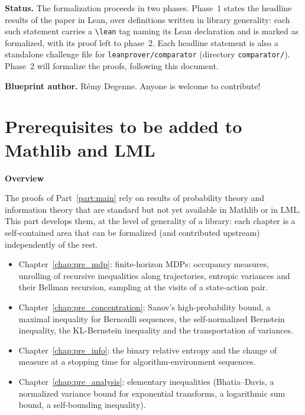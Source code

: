 \textbf{Status.} The formalization proceeds in two phases. Phase~1 states the headline results
of the paper in Lean, over definitions written in library generality: each such statement
carries a \verb+\lean+ tag naming its Lean declaration and is marked as formalized, with its
proof left to phase~2. Each headline statement is also a standalone challenge file for
\texttt{leanprover/comparator} (directory \texttt{comparator/}). Phase~2 will formalize the
proofs, following this document.

\textbf{Blueprint author.} Rémy Degenne. Anyone is welcome to contribute!









\part{Prerequisites to be added to Mathlib and LML}
\label{part:prereq}

\textbf{Overview}

The proofs of Part~\ref{part:main} rely on results of probability theory and information theory
that are standard but not yet available in Mathlib or in LML. This part develops them, at the
level of generality of a library: each chapter is a self-contained area that can be formalized
(and contributed upstream) independently of the rest.
\begin{itemize}
  \item Chapter~\ref{chap:pre_mdp}: finite-horizon MDPs: occupancy measures, unrolling of
        recursive inequalities along trajectories, entropic variances and their Bellman
        recursion, sampling at the visits of a state-action pair.
  \item Chapter~\ref{chap:pre_concentration}: Sanov's high-probability bound, a maximal
        inequality for Bernoulli sequences, the self-normalized Bernstein inequality, the
        KL-Bernstein inequality and the transportation of variances.
  \item Chapter~\ref{chap:pre_info}: the binary relative entropy and the change of measure at
        a stopping time for algorithm-environment sequences.
  \item Chapter~\ref{chap:pre_analysis}: elementary inequalities (Bhatia--Davis, a normalized
        variance bound for exponential transforms, a logarithmic sum bound, a self-bounding
        inequality).
\end{itemize}





